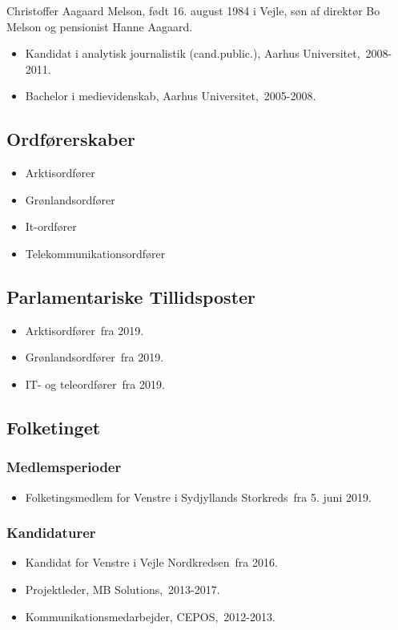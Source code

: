 \documentclass[11pt, a4paper]{awesome-cv}
\begin{document}
\makecvheader[R]
\makelettertitle
\begin{cvletter}
Christoffer Aagaard Melson, født 16. august 1984 i Vejle, søn af direktør Bo Melson og pensionist Hanne Aagaard.

\begin{itemize}
\item Kandidat i analytisk journalistik (cand.public.), Aarhus Universitet, 2008-2011.
\item Bachelor i medievidenskab, Aarhus Universitet, 2005-2008.
\end{itemize}
\subsection*{Ordførerskaber}
\begin{itemize}
\item Arktisordfører
\item Grønlandsordfører
\item It-ordfører
\item Telekommunikationsordfører
\end{itemize}
\subsection*{Parlamentariske Tillidsposter}
\begin{itemize}
\item Arktisordfører fra 2019.
\item Grønlandsordfører fra 2019.
\item IT- og teleordfører fra 2019.
\end{itemize}
\subsection*{Folketinget}
\subsubsection*{Medlemsperioder}
\begin{itemize}
\item Folketingsmedlem for Venstre i Sydjyllands Storkreds fra 5. juni 2019.
\end{itemize}
\subsubsection*{Kandidaturer}
\begin{itemize}
\item Kandidat for Venstre i Vejle Nordkredsen fra 2016.
\end{itemize}
\begin{itemize}
\item Projektleder, MB Solutions, 2013-2017.
\item Kommunikationsmedarbejder, CEPOS, 2012-2013.
\end{itemize}
\end{cvletter}
\end{document}
